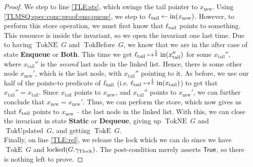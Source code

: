 \documentclass[a4paper, 10pt]{report}
\theoremstyle{definition}
\newcommand{\locked}{\operatorname{locked}}
\newcommand{\locN}[1]{\loc_{\mathrm{#1}}}
\newcommand{\loctail}{\locN{tail}}
\newcommand{\nIn}[1]{\operatorname{in}(#1)}
\newcommand{\node}{x}
\newcommand{\nodeN}[1]{\node_{\mathrm{#1}}}
\newcommand{\nodetail}{\nodeN{tail}}
\newcommand{\nodenew}{\nodeN{new}}
\newcommand{\StaticState}{\textbf{Static}\xspace}
\newcommand{\EnqueueState}{\textbf{Enqueue}\xspace}
\newcommand{\DequeueState}{\textbf{Dequeue}\xspace}
\newcommand{\BothState}{\textbf{Both}\xspace}
\newcommand{\Qg}{G}
\newcommand{\gtlock}{\gname_{\mathrm{Tlock}}}
\newcommand{\TokE}[1]{\operatorname{TokE} ~ #1}
\newcommand{\TokEQg}{\TokE{\Qg}}
\newcommand{\TokNE}[1]{\operatorname{TokNE} ~ #1}
\newcommand{\TokNEQg}{\TokNE{\Qg}}
\newcommand{\TokBefore}[1]{\operatorname{TokBefore} ~ #1}
\newcommand{\TokBeforeQg}{\TokBefore{\Qg}}
\newcommand{\TokUpdated}[1]{\operatorname{TokUpdated} ~ #1}
\newcommand{\TokUpdatedQg}{\TokUpdated{\Qg}}
\begin{document}
\begin{proof}
We step to line \ref{TLE:sts}, which swings the tail pointer to $\nodenew$. Using \ref{TLMSQ:spec:conc:proof:enq:queue}, we step to $\loctail \gets \nIn{\nodenew}$. However, to perform this store operation, we must first know that $\loctail$ points to something. This resource is inside the invariant, so we open the invariant one last time. Due to having $\TokNEQg$ and $\TokBeforeQg$, we know that we are in the after case of state \EnqueueState or \BothState. This time we get $\loctail \mapsto^{\frac{1}{2}} \nIn{\nodetail''}$ for some $\nodetail''$, where $\nodetail''$ is the \textit{second} last node in the linked list. Hence, there is some other node $\nodenew'$, which is the last node, with $\nodetail''$ pointing to it. As before, we use our half of the points-to predicate of $\loctail$ (i.e. $\loctail \mapsto^{\frac{1}{2}} \nIn{\nodetail}$) to get that $\nodetail'' = \nodetail$. Since $\nodetail$ points to $\nodenew$, and $\nodetail''$ points to $\nodenew'$, we can further conclude that $\nodenew = \nodenew'$. Thus, we can perform the store, which now gives us that $\loctail$ points to $\nodenew$ -- the last node in the linked list. With this, we can close the invariant in state \StaticState or \DequeueState, giving up $\TokNEQg$ and $\TokUpdatedQg$, and getting $\TokEQg$.\\
Finally, on line \ref{TLE:rel}, we release the lock which we can do since we have $\TokEQg$ and $\locked(\Qg.\gtlock)$. The post-condition merely asserts $\textsf{True}$, so there is nothing left to prove.
\end{proof}
\end{document}
